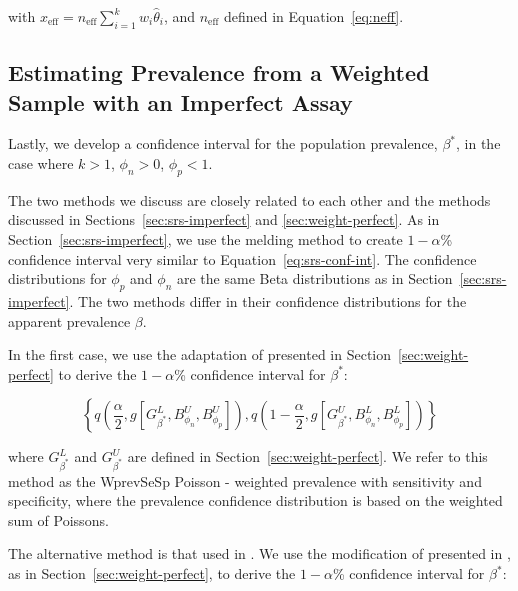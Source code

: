 \documentclass[AMA,STIX1COL]{WileyNJD-v2}
\begin{document}
with \( x_{\text{eff}} = n_{\text{eff}} \sum_{i=1}^k w_i \hat{\theta}_i \), and \( n_{\text{eff}} \) defined in Equation~\ref{eq:neff}.

\subsection{Estimating Prevalence from a Weighted Sample with an Imperfect Assay}
\label{sec:weight-imperfect}

Lastly, we develop a confidence interval for the population prevalence, \( \beta^* \), in the case where \( k > 1 \), \( \phi_n > 0 \), \( \phi_p < 1 \).

The two methods we discuss are closely related to each other and the methods discussed in Sections~\ref{sec:srs-imperfect} and \ref{sec:weight-perfect}.
As in Section~\ref{sec:srs-imperfect}, we use the melding method \cite{FayP:2015} to create \( 1 - \alpha \)\% confidence interval very similar to Equation~\ref{eq:srs-conf-int}.
The confidence distributions for \( \phi_p \) and \( \phi_n \) are the same Beta distributions as in Section~\ref{sec:srs-imperfect}.
The two methods differ in their confidence distributions for the apparent prevalence \( \beta \).

In the first case, we use the adaptation of \cite{FayF:1997} presented in Section~\ref{sec:weight-perfect} to derive the \( 1 - \alpha \)\% confidence interval for \( \beta^* \):

\begin{equation}
    \left\{ q \left( \frac{\alpha}{2}, %
    g \left[ G^L_{\beta^*}, B^U_{\phi_n}, B^U_{\phi_p} \right]
    \right),  q \left( 1 - \frac{\alpha}{2}, %
       g \left[G^U_{\beta^*}, B^L_{\phi_n}, B^L_{\phi_p} \right] \right)
       \right\}
\end{equation}

where  \( G_{\beta^*}^L \) and \( G_{\beta^*}^U \) are defined in Section~\ref{sec:weight-perfect}.
We refer to this method as the WprevSeSp Poisson - weighted prevalence with sensitivity and specificity, where the prevalence confidence distribution is based on the weighted sum of Poissons.

The alternative method is that used in \cite{Kali:2021}.
We use the  modification of \cite{Korn:1998} presented in \cite{Dean:2015}, as in Section~\ref{sec:weight-perfect}, to derive the \( 1 - \alpha \)\% confidence interval for \( \beta^* \):
\end{document}
